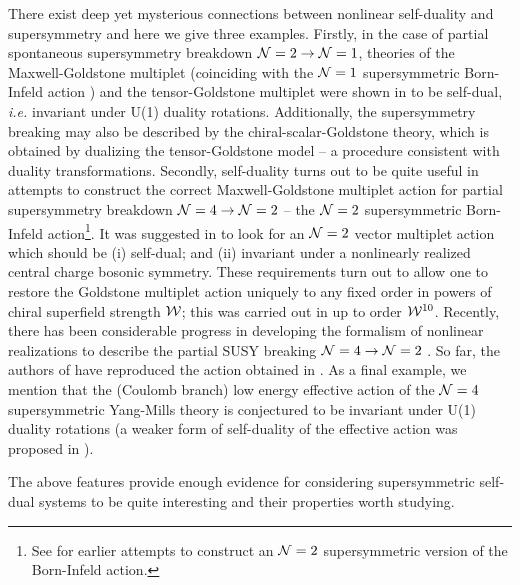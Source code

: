 There exist deep yet mysterious connections between nonlinear self-duality and supersymmetry and here we give three examples. Firstly, in the case of partial spontaneous supersymmetry breakdown ${\cal N}=2 \to {\cal N}=1$, theories of the Maxwell-Goldstone multiplet \cite{Bagger:1996wp,Rocek:1997hi} (coinciding with the ${\cal N}=1$ supersymmetric Born-Infeld action \cite{Cecotti:1986gb}) and the tensor-Goldstone multiplet \cite{Bagger:1997pi,Rocek:1997hi} were shown in \cite{Kuzenko:2000tg,Kuzenko:2000uh} to be self-dual, {\it i.e.} invariant under U(1) duality rotations. Additionally, the supersymmetry breaking may also be described by the chiral-scalar-Goldstone theory, which is obtained by dualizing the tensor-Goldstone model -- a procedure consistent with duality transformations. Secondly, self-duality turns out to be quite useful in attempts to construct the correct Maxwell-Goldstone multiplet action for partial supersymmetry breakdown ${\cal N}=4 \to {\cal N}=2$ -- the ${\cal N}=2$ supersymmetric Born-Infeld action\footnote{See \cite{Ketov:1998sx,Ketov:2000zw} for earlier attempts to construct an ${\cal N}=2$ supersymmetric version of the Born-Infeld action.}. It was suggested in \cite{Kuzenko:2000uh} to look for an ${\cal N}=2$ vector multiplet action which should be (i) self-dual; and (ii) invariant under a nonlinearly realized central charge bosonic symmetry. These requirements turn out to allow one to restore the Goldstone multiplet action uniquely to any fixed order in powers of chiral superfield strength ${\cal W}$; this was carried out in \cite{Kuzenko:2000uh} up to order ${\cal W}^{10}$. Recently, there has been considerable progress in developing the formalism of nonlinear realizations to describe the partial SUSY breaking ${\cal N}=4 \to {\cal N}=2$ \cite{Bellucci:2000ft,Bellucci:2001hd,Bellucci:2000kc}. So far, the authors of \cite{Bellucci:2000ft,Bellucci:2001hd,Bellucci:2000kc} have reproduced the action obtained in \cite{Kuzenko:2000uh}. As a final example, we mention that the (Coulomb branch) low energy effective action of the ${\cal N}=4$ supersymmetric Yang-Mills theory is conjectured to be invariant under U(1) duality rotations \cite{Kuzenko:2000tg} (a weaker form of self-duality of the effective action was proposed in \cite{Gonzalez-Rey:1998uh}).

The above features provide enough evidence for considering supersymmetric self-dual systems to be quite interesting and their properties worth studying. 


\vskip0.5cm
